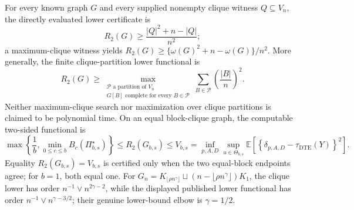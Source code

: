 For every known graph \(G\) and every supplied nonempty clique witness \(Q\subseteq V_n\), the directly evaluated lower certificate is
\[
R_2(G)\geq\frac{|Q|^2+n-|Q|}{n^2};
\]
a maximum-clique witness yields \(R_2(G)\geq\{\omega(G)^2+n-\omega(G)\}/n^2\).  More generally, the finite clique-partition lower functional is
\[
R_2(G)\geq\max_{\substack{\mathcal P\text{ a partition of }V_n\\G[B]\text{ complete for every }B\in\mathcal P}}\sum_{B\in\mathcal P}\left(\frac{|B|}{n}\right)^2.
\]
Neither maximum-clique search nor maximization over clique partitions is claimed to be polynomial time.  On an equal block-clique graph, the computable two-sided functional is
\[
\max\left\{\frac1b,\min_{0\leq c\leq b}B_c(\Pi_{b,s}^{\star})\right\}
\leq R_2(G_{b,s})\leq V_{b,s}
=\inf_{p,A,D}\sup_{u\in\Theta_{b,s}}\mathbb E\!\left[\left\{\delta_{p,A,D}-\tau_{\mathrm{DTE}}(Y)\right\}^2\right].
\]
Equality \(R_2(G_{b,s})=V_{b,s}\) is certified only when the two equal-block endpoints agree; for \(b=1\), both equal one.  For \(G_n=K_{\lfloor\rho n^{\gamma}\rfloor}\sqcup(n-\lfloor\rho n^{\gamma}\rfloor)K_1\), the clique lower has order \(n^{-1}\vee n^{2\gamma-2}\), while the displayed published lower functional has order \(n^{-1}\vee n^{\gamma-3/2}\); their genuine lower-bound elbow is \(\gamma=1/2\).